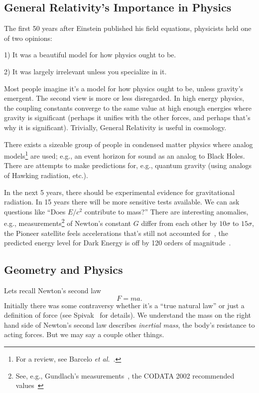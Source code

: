 \subsection{General Relativity's Importance in Physics}
The first 50 years after Einstein published his field equations,
physicists held one of two opinions:

1) It was a beautiful model for how physics ought to be.

2) It was largely irrelevant unless you specialize in it.

\noindent\ignorespaces%
Most people imagine it's a model for how physics ought to be,
unless gravity's emergent. The second view is more or less
disregarded. In high energy physics, the coupling constants
converge to the same value at high enough energies where gravity
is significant (perhaps it unifies with the other forces, and
perhaps that's why it is significant). Trivially, General
Relativity is useful in cosmology.

There exists a sizeable group of people in condensed matter physics
where analog models\footnote{For a review, see Barcelo \emph{et al.}~\cite{Barcelo:2005fc}.} are used; e.g., an event horizon for sound
as an analog to Black Holes. There are attempts to make
predictions for, e.g., quantum gravity (using analogs of Hawking
radiation, etc.).

In the next 5 years, there should be experimental evidence for
gravitational radiation. In 15 years there will be more sensitive
tests available. We can ask questions like ``Does $E/c^{2}$
contribute to mass?'' There are interesting anomalies, e.g.,
measurements\footnote{See, e.g., Gundlach's measurements~\cite{gundlach},
the CODATA 2002 recommended values~\cite{CODATA2002}}
 of Newton's constant $G$ differ from each other by
$10\sigma$ to $15\sigma$, the Pioneer satellite feels
accelerations that's still not accounted for~\cite{Nieto:2007ng}, the predicted
energy level for Dark Energy is off by 120 orders of magnitude~\cite{Martin:2012bt}.

\subsection{Geometry and Physics}
Lets recall Newton's second law 
\begin{equation}\label{eq:lec01:newtonSecondLaw}
F=ma.
\end{equation}
Initially there was some contraversy whether it's a ``true
natural law'' or just a definition of force 
(see Spivak~\cite{spivak:2010} for details). We understand the
mass on the right hand side of Newton's second law describes
\emph{inertial mass}, the body's resistance to acting forces. But
we may say a couple other things.

